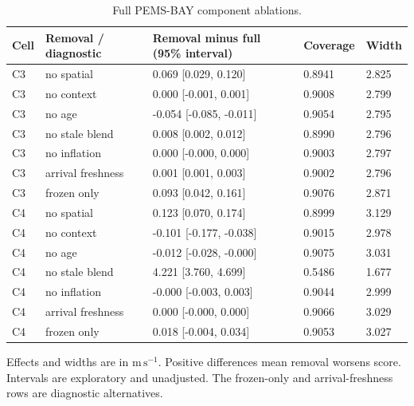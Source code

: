 \documentclass[pdflatex,sn-mathphys-num]{sn-jnl}
\newcommand{\ms}{\mathrm{m\,s^{-1}}}
\begin{document}
\begin{table}[!htbp]
\caption{Full PEMS-BAY component ablations.}\label{tab:ablation-pems}
\centering\setlength{\tabcolsep}{3pt}\small
\begin{tabular}{lllll}\toprule
Cell & Removal / diagnostic & Removal minus full (95\% interval) & Coverage & Width \\\midrule
C3 & no spatial & 0.069 [0.029, 0.120] & 0.8941 & 2.825 \\
C3 & no context & 0.000 [-0.001, 0.001] & 0.9008 & 2.799 \\
C3 & no age & -0.054 [-0.085, -0.011] & 0.9054 & 2.795 \\
C3 & no stale blend & 0.008 [0.002, 0.012] & 0.8990 & 2.796 \\
C3 & no inflation & 0.000 [-0.000, 0.000] & 0.9003 & 2.797 \\
C3 & arrival freshness & 0.001 [0.001, 0.003] & 0.9002 & 2.796 \\
C3 & frozen only & 0.093 [0.042, 0.161] & 0.9076 & 2.871 \\
C4 & no spatial & 0.123 [0.070, 0.174] & 0.8999 & 3.129 \\
C4 & no context & -0.101 [-0.177, -0.038] & 0.9015 & 2.978 \\
C4 & no age & -0.012 [-0.028, -0.000] & 0.9075 & 3.031 \\
C4 & no stale blend & 4.221 [3.760, 4.699] & 0.5486 & 1.677 \\
C4 & no inflation & -0.000 [-0.003, 0.003] & 0.9044 & 2.999 \\
C4 & arrival freshness & 0.000 [-0.000, 0.000] & 0.9066 & 3.029 \\
C4 & frozen only & 0.018 [-0.004, 0.034] & 0.9053 & 3.027 \\
\bottomrule\end{tabular}
\par\smallskip\footnotesize Effects and widths are in $\ms$. Positive differences mean removal worsens score. Intervals are exploratory and unadjusted. The frozen-only and arrival-freshness rows are diagnostic alternatives.
\end{table}
\FloatBarrier
\end{document}

